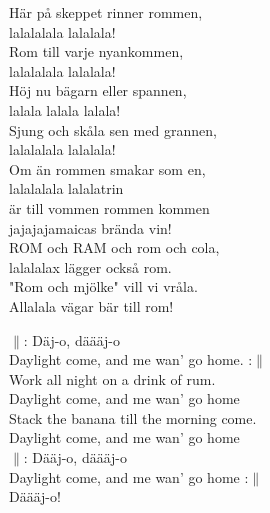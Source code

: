 \documentclass[a6paper, 10pt, twoside]{article}
\begin{document}
\noindent
\begin{center}
\end{center}
\begin{lyrics}
Här på skeppet rinner rommen,\\
lalalalala lalalala!\\
Rom till varje nyankommen,\\
lalalalala lalalala!\\
Höj nu bägarn eller spannen,\\
lalala lalala lalala!\\
Sjung och skåla sen med grannen,\\
lalalalala lalalala!
\vspace{5pt}\\
Om än rommen smakar som en,\\
lalalalala lalalatrin\\
är till vommen rommen kommen\\
jajajajamaicas brända vin!\\
ROM och RAM och rom och cola,\\
lalalalax lägger också rom.\\
"Rom och mjölke" vill vi vråla.\\
Allalala vägar bär till rom! 
\end{lyrics}
\begin{center}
\end{center}
\begin{lyrics}
$\|$: Däj-o, däääj-o\\
Daylight come, and me wan' go home. :$\|$\\
Work all night on a drink of rum.\\
Daylight come, and me wan' go home\\
Stack the banana till the morning come.\\
Daylight come, and me wan' go home
\vspace{5pt}\\
$\|$: Dääj-o, däääj-o\\
Daylight come, and me wan' go home :$\|$\\
Däääj-o! 
\end{lyrics}
\end{document}
